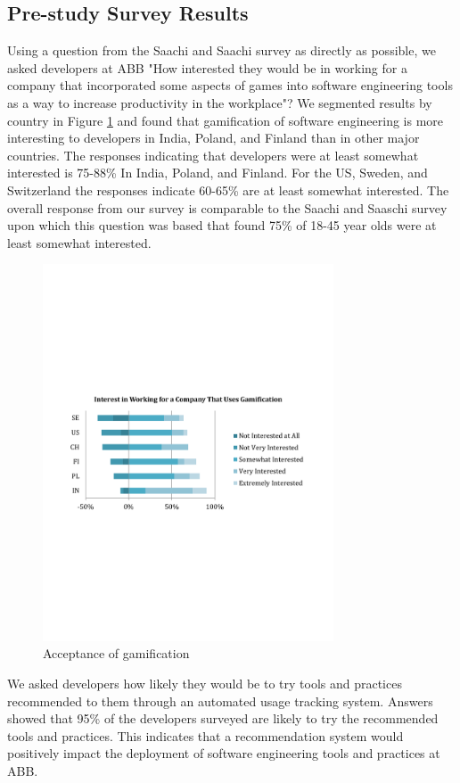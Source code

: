 \documentclass{sig-alternate}
\begin{document}
\subsection{Pre-study Survey Results}

Using a question from the Saachi and Saachi survey \cite{wbsnipes:SaatchiGameification} as directly as possible, we asked developers at ABB "How interested they would be in working for a company that incorporated some aspects of games into software engineering tools as a way to increase productivity in the workplace"?  We segmented results by country in Figure \ref{fig:gamification} and found that gamification of software engineering is more interesting to developers in India, Poland, and Finland than in other major countries.  The responses indicating that developers were at least somewhat interested is 75-88\% In India, Poland, and Finland.  For the US, Sweden, and Switzerland the responses indicate 60-65\% are at least somewhat interested.  The overall response from our survey is comparable to the Saachi and Saaschi survey\cite{wbsnipes:SaatchiGameification} upon which this question was based that found 75\% of 18-45 year olds were at least somewhat interested.  
\begin{figure}
	\includegraphics[width=3.4in]{gamificationquestion.pdf}
	\caption{Acceptance of gamification}
	\label{fig:gamification}
\end{figure}

We asked developers how likely they would be to try tools and practices recommended to them through an automated usage tracking system.  Answers showed that 95\% of the developers surveyed are likely to try the recommended tools and practices.  This indicates that a recommendation system would positively impact the deployment of software engineering tools and practices at ABB.
\end{document}
